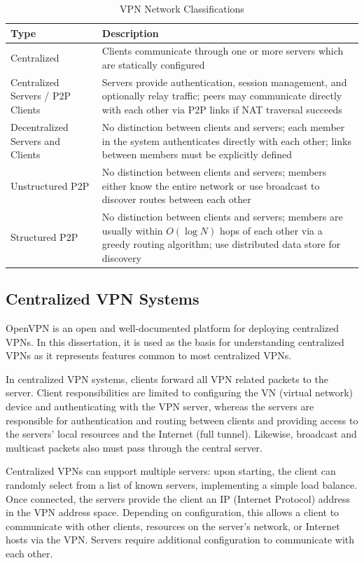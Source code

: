 \begin{center}
\begin{table}
\caption{VPN Network Classifications}
\label{tab:vpn_types}
\begin{tabular}{p{1.5in}p{4.5in}} \hline
Type & Description \\ \hline
Centralized & Clients communicate through one or more servers which are statically
configured \\
Centralized Servers / P2P Clients & Servers provide authentication, session management, and
optionally relay traffic; peers may communicate directly with each
other via P2P links if NAT traversal succeeds\\
Decentralized Servers and Clients & No distinction between clients and servers;
each member in the system authenticates directly with each other; links between
members must be explicitly defined \\
Unstructured P2P & No distinction between clients and servers; members either know
the entire network or use broadcast to discover routes between each other \\
Structured P2P & No distinction between clients and servers; members are usually
within $O(\log N)$ hops of each other via a greedy routing algorithm; use
distributed data store for discovery \\ \hline
\end{tabular}
\end{table}
\end{center}


\subsection{Centralized VPN Systems}

OpenVPN is an open and well-documented platform for deploying centralized VPNs.
In this dissertation, it is used as the basis for understanding centralized
VPNs as it represents features common to most centralized VPNs.

In centralized VPN systems, clients forward all VPN related packets to the
server.  Client responsibilities are limited to configuring the VN (virtual
network) device and authenticating with the VPN server, whereas the servers are
responsible for authentication and routing between clients and providing access
to the servers' local resources and the Internet (full tunnel).  Likewise,
broadcast and multicast packets also must pass through the central server.

Centralized VPNs can support multiple servers: upon starting, the client can
randomly select from a list of known servers, implementing a simple load
balance.  Once connected, the servers provide the client an IP (Internet
Protocol) address in the VPN address space. Depending on configuration, this
allows a client to communicate with other clients, resources on the server's
network, or Internet hosts via the VPN.  Servers require additional
configuration to communicate with each other.

